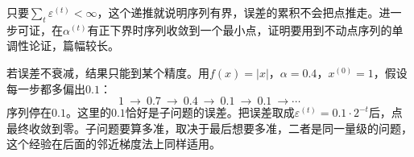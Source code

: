 只要$\sum_t\varepsilon^{(t)}<\infty$，这个递推就说明序列有界，误差的累积不会把点推走。进一步可证，在$\alpha^{(t)}$有正下界时序列收敛到一个最小点，证明要用到不动点序列的单调性论证，篇幅较长。

若误差不衰减，结果只能到某个精度。用$f(x)=\lvert x\rvert$，$\alpha=0.4$，$x^{(0)}=1$，假设每一步都多偏出$0.1$：
\[
 1\ \to\ 0.7\ \to\ 0.4\ \to\ 0.1\ \to\ 0.1\ \to\cdots
\]
序列停在$0.1$。这里的$0.1$恰好是子问题的误差。把误差取成$\varepsilon^{(t)}=0.1\cdot2^{-t}$后，点最终收敛到零。子问题要算多准，取决于最后想要多准，二者是同一量级的问题，这个经验在后面的邻近梯度法上同样适用。
